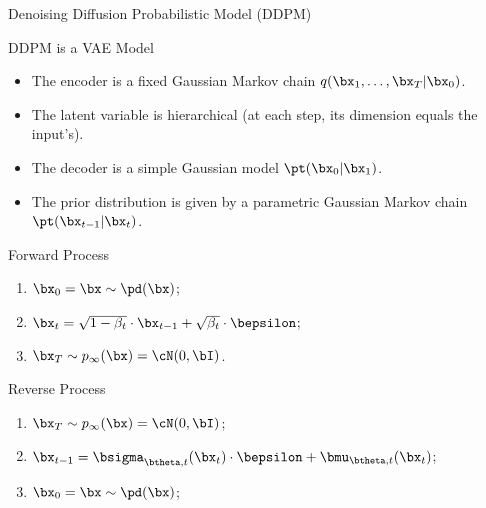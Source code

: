 \documentclass{beamer}
\begin{document}
\begin{frame}{Denoising Diffusion Probabilistic Model (DDPM)}
    \begin{block}{DDPM is a VAE Model}
        \begin{itemize}
            \item The encoder is a fixed Gaussian Markov chain $q(\bx_1, \dots, \bx_T | \bx_0)$.
            \item The latent variable is hierarchical (at each step, its dimension equals the input's).
            \item The decoder is a simple Gaussian model $\pt(\bx_0 | \bx_1)$.
            \item The prior distribution is given by a parametric Gaussian Markov chain $\pt(\bx_{t-1} | \bx_t)$.
        \end{itemize}
    \end{block}
    \eqpause
    \begin{minipage}{0.5\linewidth}
        \begin{block}{Forward Process}
            \begin{enumerate}
                \item $\bx_0 = \bx \sim \pd(\bx)$;
                \item $\bx_t = \sqrt{1 - \beta_t} \cdot \bx_{t - 1} + \sqrt{\beta_t} \cdot \bepsilon$;
                \item $\bx_T \sim p_{\infty}(\bx) = \cN(0, \bI)$.
            \end{enumerate}
        \end{block}
    \end{minipage}%
    \eqpause
    \begin{minipage}{0.55\linewidth}
        \begin{block}{Reverse Process}
            \begin{enumerate}
                \item $\bx_T \sim p_{\infty}(\bx) = \cN(0, \bI)$;
                \item $\bx_{t - 1} = \bsigma_{\btheta, t}(\bx_t) \cdot \bepsilon + \bmu_{\btheta, t}(\bx_t)$;
                \item $\bx_0 = \bx \sim \pd(\bx)$;
            \end{enumerate}
        \end{block}
    \end{minipage}
\end{frame}
\end{document}
